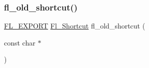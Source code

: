 \subsubsection{\texorpdfstring{fl\+\_\+old\+\_\+shortcut()}{fl\_old\_shortcut()}}
{\footnotesize\ttfamily \hyperlink{_fl___export_8_h_aa9ba29a18aee9d738370a06eeb4470fc}{F\+L\+\_\+\+E\+X\+P\+O\+RT} \hyperlink{fl__types_8h_a37ec1cd050a604a45dff00efba45609d}{Fl\+\_\+\+Shortcut} fl\+\_\+old\+\_\+shortcut (\begin{DoxyParamCaption}\item[{const char $\ast$}]{ }\end{DoxyParamCaption})}

